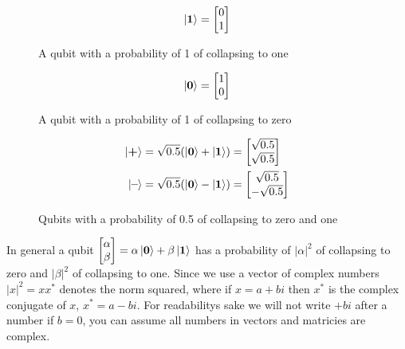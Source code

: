 \newcommand{\qto}{\mathbf{1}}
\newcommand{\qtz}{\mathbf{0}}
\newcommand{\qtp}{\textbf{+}}
\newcommand{\qtm}{\textbf{--}}
\newcommand{\qti}{\mathbf{I}}
\newcommand{\qtr}[1]{\mathbf{R_{#1}}}
\newcommand{\qtx}{\mathbf{X}}
\newcommand{\qth}{\mathbf{H}}
\newcommand{\qtcx}{\mathbf{CX}}
\begin{figure}[H]
    \centering
    \begin{equation*}
        \ket{\qto} =\qo    
    \end{equation*}
    \caption{A qubit with a probability of 1 of collapsing 
    to one}
    \label{fig:q1}
\end{figure}
\begin{figure}[H]
    \centering
    \begin{equation*}
        \ket{\qtz} =\qz
    \end{equation*}
    \caption{A qubit with a probability of 1 of collapsing to zero}
    \label{fig:q0}
\end{figure}
\begin{figure}[H]
    \centering
    \begin{align*}
    \ket{\qtp} &= \sqrt{0.5}(\ket{\qtz} + \ket{\qto}) = \qp\\
    \ket{\qtm} &= \sqrt{0.5}(\ket{\qtz} - \ket{\qto}) = \qm
    \end{align*}
    \caption{Qubits with a probability of 0.5 of collapsing to zero and one}
    \label{fig:q+}
\end{figure}
\noindent
In general a qubit
$
\begin{bmatrix}
    \alpha\\
    \beta\\
\end{bmatrix}
= \alpha \ket{\qtz} + \beta \ket{\qto}
$
has a probability of $|\alpha|^2$ of collapsing to zero and $|\beta|^2$ of collapsing to one.
Since we use a vector of complex numbers $|x|^2=xx^*$ denotes the norm squared, where if $x=a+bi$ then $x^*$ is the complex conjugate of $x$, $x^* =a-bi$.
For readabilitys sake we will not write $+bi$ after a number if $b=0$, you can assume all numbers in vectors and matricies are complex.

